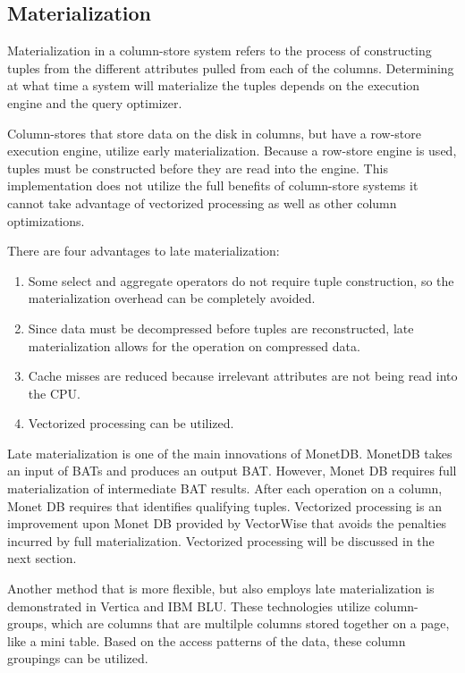 \subsection*{Materialization}


Materialization in a column-store system refers to the process of constructing tuples from the different attributes pulled from each of the columns. Determining at what time a system will materialize the tuples depends on the execution engine and the query optimizer.


Column-stores that store data on the disk in columns, but have a row-store execution engine, utilize early materialization. Because a row-store engine is used, tuples must be constructed before they are read into the engine. This implementation does not utilize the full benefits of column-store systems it cannot take advantage of vectorized processing as well as other column optimizations.


There are four advantages to late materialization\cite{colvsrow}:


\begin{enumerate}
	\item Some select and aggregate operators do not require tuple construction, so the materialization overhead can be completely avoided.
	\item Since data must be decompressed before tuples are reconstructed, late materialization allows for the operation on compressed data.
	\item Cache misses are reduced because irrelevant attributes are not being read into the CPU.
	\item Vectorized processing can be utilized.
\end{enumerate}


Late materialization is one of the main innovations of MonetDB. MonetDB takes an input of BATs and produces an output BAT. However, Monet DB requires full materialization of intermediate BAT results. After each operation on a column, Monet DB requires that identifies qualifying tuples\cite{monetcpu}. Vectorized processing is an improvement upon Monet DB provided by VectorWise that avoids the penalties incurred by full materialization\cite{vectorwise}. Vectorized processing will be discussed in the next section.


Another method that is more flexible, but also employs late materialization is demonstrated in Vertica and IBM BLU. These technologies utilize column-groups, which are columns that are multilple columns stored together on a page, like a mini table\cite{now}. Based on the access patterns of the data, these column groupings can be utilized.



